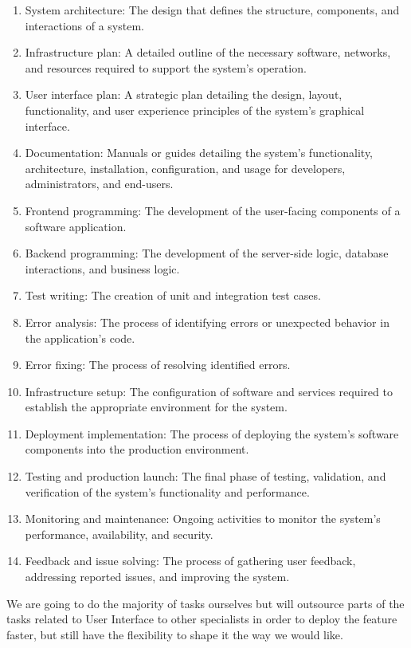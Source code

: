 \documentclass[
    english, %
]{VUMIFPSkursinis}
\begin{document}
\begin{enumerate}[label=\arabic*.]
    \item System architecture: The design that defines the structure, components, and interactions of a system.
    \item Infrastructure plan: A detailed outline of the necessary software, networks, and resources required to support the system's operation.
    \item User interface plan: A strategic plan detailing the design, layout, functionality, and user experience principles of the system's graphical interface.
    \item Documentation: Manuals or guides detailing the system's functionality, architecture, installation, configuration, and usage for developers, administrators, and end-users.
    \item Frontend programming: The development of the user-facing components of a software application.
    \item Backend programming: The development of the server-side logic, database interactions, and business logic.
    \item Test writing: The creation of unit and integration test cases.
    \item Error analysis: The process of identifying errors or unexpected behavior in the application’s code.
    \item Error fixing: The process of resolving identified errors.
    \item Infrastructure setup: The configuration of software and services required to establish the appropriate environment for the system.
    \item Deployment implementation: The process of deploying the system's software components into the production environment.
    \item Testing and production launch: The final phase of testing, validation, and verification of the system's functionality and performance.
    \item Monitoring and maintenance: Ongoing activities to monitor the system's performance, availability, and security. 
    \item Feedback and issue solving: The process of gathering user feedback, addressing reported issues, and improving the system.
\end{enumerate}

We are going to do the majority of tasks ourselves but will outsource parts of the tasks related to User Interface to other specialists in order to deploy the feature faster, but still have the flexibility to shape it the way we would like.
\end{document}
